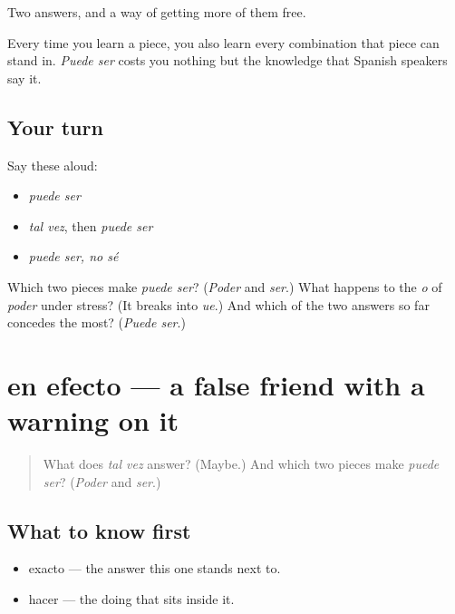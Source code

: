\begin{grammarlens}[title={What you've built}]
Two answers, and a way of getting more of them free.

Every time you learn a piece, you also learn every combination that piece can stand in. \emph{Puede ser} costs you nothing but the knowledge that Spanish speakers say it.
\end{grammarlens}

\subsection*{Your turn}
Say these aloud:

\begin{itemize}
\raggedright
  \item \emph{puede ser}
  \item \emph{tal vez}, then \emph{puede ser}
  \item \emph{puede ser, no sé}
\end{itemize}

\begin{tcolorbox}[breakable,colback=teal!4,colframe=teal!35!black,title={Before you move on}]
Which two pieces make \emph{puede ser}? (\emph{Poder} and \emph{ser}.) What happens to the \emph{o} of \emph{poder} under stress? (It breaks into \emph{ue}.) And which of the two answers so far concedes the most? (\emph{Puede ser}.)
\end{tcolorbox}
\section[en efecto]{en efecto — a false friend with a warning on it}

\label{lesson:ES-C298-en-efecto}



\begin{quote}
What does \emph{tal vez} answer? (Maybe.) And which two pieces make \emph{puede ser}? (\emph{Poder} and \emph{ser}.)
\end{quote}

\subsection*{What to know first}
\begin{itemize}
\raggedright
  \item exacto — the answer this one stands next to.
  \item hacer — the doing that sits inside it.
\end{itemize}

